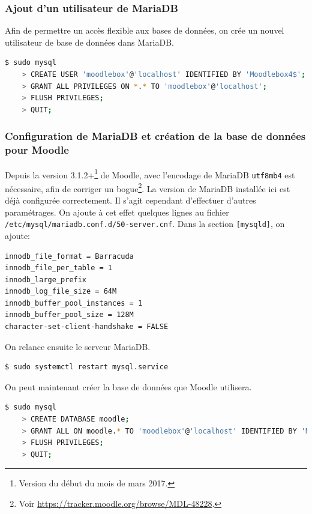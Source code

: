 \documentclass[11pt]{article}
\begin{document}
\subsubsection{Ajout d'un utilisateur de MariaDB}

Afin de permettre un accès flexible aux bases de données, on crée un nouvel utilisateur de base de données dans MariaDB.

\begin{lstlisting}[language=bash]
$ sudo mysql
    > CREATE USER 'moodlebox'@'localhost' IDENTIFIED BY 'Moodlebox4$';
    > GRANT ALL PRIVILEGES ON *.* TO 'moodlebox'@'localhost';
    > FLUSH PRIVILEGES;
    > QUIT;
\end{lstlisting}

\subsubsection{Configuration de MariaDB et création de la base de données pour Moodle}

Depuis la version 3.1.2+\footnote{Version du début du mois de mars 2017.} de Moodle, avec l'encodage de MariaDB \lstinline{utf8mb4} est nécessaire, afin de corriger un bogue\footnote{Voir \url{https://tracker.moodle.org/browse/MDL-48228}.}. La version de MariaDB installée ici est déjà configurée correctement. Il s'agit cependant d'effectuer d'autres paramétrages. On ajoute à cet effet quelques lignes au fichier \lstinline{/etc/mysql/mariadb.conf.d/50-server.cnf}. Dans la section \lstinline{[mysqld]}, on ajoute:
\begin{lstlisting}[language=bash]
innodb_file_format = Barracuda
innodb_file_per_table = 1
innodb_large_prefix
innodb_log_file_size = 64M
innodb_buffer_pool_instances = 1
innodb_buffer_pool_size = 128M
character-set-client-handshake = FALSE
\end{lstlisting}

On relance ensuite le serveur MariaDB.
\begin{lstlisting}[language=bash]
$ sudo systemctl restart mysql.service
\end{lstlisting}

On peut maintenant créer la base de données que Moodle utilisera.

\begin{lstlisting}[language=bash]
$ sudo mysql
    > CREATE DATABASE moodle;
    > GRANT ALL ON moodle.* TO 'moodlebox'@'localhost' IDENTIFIED BY 'Moodlebox4$';
    > FLUSH PRIVILEGES;
    > QUIT;
\end{lstlisting}
\end{document}
